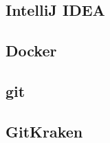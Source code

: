     \subsection{IntelliJ IDEA} %
    \subsection{Docker}
    \subsection{git}
    \subsection{GitKraken}

%
%
%
%
%
%
%
